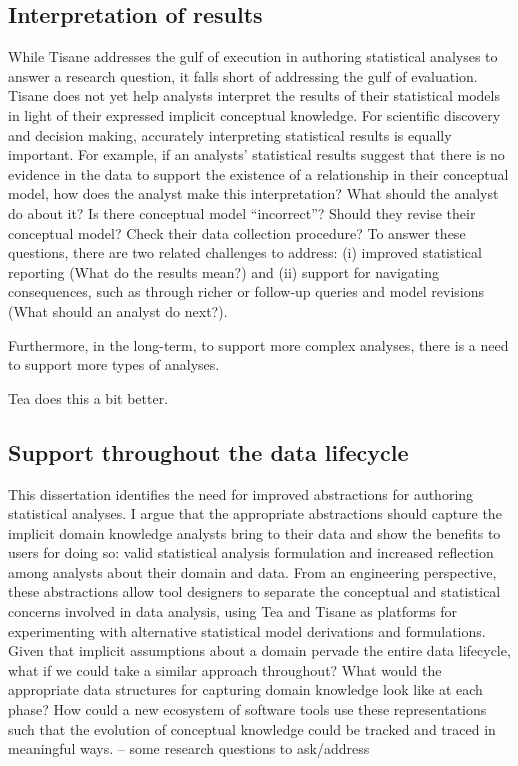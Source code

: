 \subsection{Interpretation of results}
While Tisane addresses the gulf of execution in authoring statistical analyses
to answer a research question, it falls short of addressing the gulf of
evaluation. Tisane does not yet help analysts interpret the results of their
statistical models in light of their expressed implicit conceptual knowledge.
For scientific discovery and decision making, accurately interpreting
statistical results is equally important. For example, if an analysts'
statistical results suggest that there is no evidence in the data to support the
existence of a relationship in their conceptual model, how does the analyst make
this interpretation? What should the analyst do about it? Is there conceptual
model ``incorrect''? Should they revise their conceptual model? Check their data
collection procedure? To answer these questions, there are two related
challenges to address: (i) improved statistical reporting (What do the results
mean?) and (ii) support for navigating consequences, such as through richer or
follow-up queries and model revisions (What should an analyst do next?). 

Furthermore, in the long-term, to support more complex analyses, there is a need
to support more types of analyses. 

Tea does this a bit better. 

\subsection{Support throughout the data lifecycle}

This dissertation identifies the need for improved abstractions for authoring
statistical analyses. I argue that the appropriate abstractions should capture
the implicit domain knowledge analysts bring to their data and show the benefits
to users for doing so: valid statistical analysis formulation and increased
reflection among analysts about their domain and data. From an engineering
perspective, these abstractions allow tool designers to separate the conceptual
and statistical concerns involved in data analysis, using Tea and Tisane as
platforms for experimenting with alternative statistical model derivations and
formulations. Given that implicit assumptions about a domain pervade the entire
data lifecycle, what if we could take a similar approach throughout? What would
the appropriate data structures for capturing domain knowledge look like at each
phase? How could a new ecosystem of software tools use these representations
such that the evolution of conceptual knowledge could be tracked and traced in
meaningful ways.  -- some research questions to ask/address

